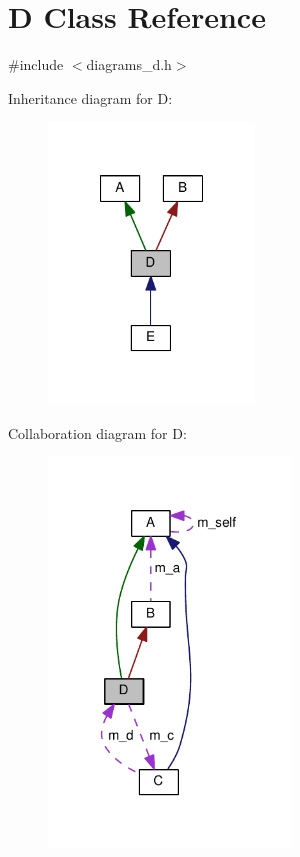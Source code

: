 \section{D Class Reference}
\label{class_d}


{\ttfamily \#include $<$diagrams\-\_\-d.\-h$>$}



Inheritance diagram for D\-:\nopagebreak
\begin{figure}[H]
\begin{center}
\leavevmode
\includegraphics[width=155pt]{class_d__inherit__graph}
\end{center}
\end{figure}


Collaboration diagram for D\-:\nopagebreak
\begin{figure}[H]
\begin{center}
\leavevmode
\includegraphics[width=183pt]{class_d__coll__graph}
\end{center}
\end{figure}
